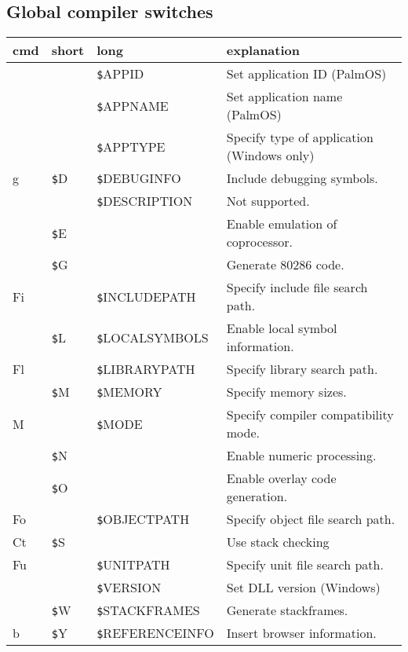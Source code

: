 \documentclass{article}
\newcommand{\var}[1]{{\texttt #1}}
\begin{document}
\subsection*{Global compiler switches}
\begin{tabularx}{\textwidth}{lllX}
\textbf{cmd} & \textbf {short} & \textbf {long} & \textbf{explanation }\\ \hline
& & \var{\$APPID} & Set application ID (PalmOS) \\
& & \var{\$APPNAME} & Set application name (PalmOS) \\
& & \var{\$APPTYPE} & Specify type of application (Windows only) \\
g& \var{\$D} & \var{\$DEBUGINFO} & Include debugging symbols. \\
& & \var{\$DESCRIPTION} & Not supported. \\
&\var{\$E} & & Enable emulation of coprocessor. \\
& \var{\$G}& & Generate 80286 code. \\
Fi& & \var{\$INCLUDEPATH} & Specify include file search path. \\
&\var{\$L} & \var{\$LOCALSYMBOLS} & Enable local symbol information. \\
Fl& & \var{\$LIBRARYPATH} & Specify library search path. \\
&\var{\$M} & \var{\$MEMORY} & Specify memory sizes. \\
M& & \var{\$MODE} & Specify compiler compatibility mode. \\
& \var{\$N}& & Enable numeric processing.  \\
& \var{\$O}& & Enable overlay code generation.  \\
Fo& & \var{\$OBJECTPATH} & Specify object file search path. \\
Ct& \var{\$S} & & Use stack checking \\
Fu& & \var{\$UNITPATH} & Specify unit file search path. \\
& & \var{\$VERSION} & Set DLL version (Windows)\\
& \var{\$W} & \var{\$STACKFRAMES} & Generate stackframes. \\
b & \var{\$Y} & \var{\$REFERENCEINFO} & Insert browser information. \\ \hline
\end{tabularx}
\end{document}
